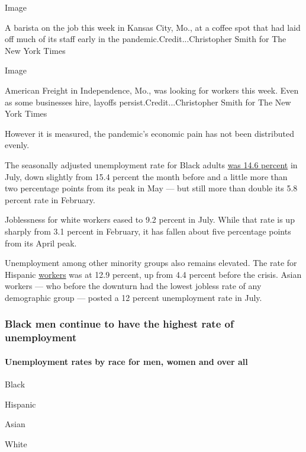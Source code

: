 Image

A barista on the job this week in Kansas City, Mo., at a coffee spot
that had laid off much of its staff early in the
pandemic.Credit...Christopher Smith for The New York Times

Image

American Freight in Independence, Mo., was looking for workers this
week. Even as some businesses hire, layoffs persist.Credit...Christopher
Smith for The New York Times

However it is measured, the pandemic's economic pain has not been
distributed evenly.

The seasonally adjusted unemployment rate for Black adults
\href{https://www.bls.gov/news.release/empsit.t02.htm}{was 14.6 percent}
in July, down slightly from 15.4 percent the month before and a little
more than two percentage points from its peak in May --- but still more
than double its 5.8 percent rate in February.

Joblessness for white workers eased to 9.2 percent in July. While that
rate is up sharply from 3.1 percent in February, it has fallen about
five percentage points from its April peak.

Unemployment among other minority groups also remains elevated. The rate
for Hispanic
\href{https://www.bls.gov/news.release/empsit.t03.htm}{workers} was at
12.9 percent, up from 4.4 percent before the crisis. Asian workers ---
who before the downturn had the lowest jobless rate of any demographic
group --- posted a 12 percent unemployment rate in July.

\hypertarget{black-men-continue-to-have-the-highest-rate-of-unemployment}{%
\subsubsection{Black men continue to have the highest rate of
unemployment}\label{black-men-continue-to-have-the-highest-rate-of-unemployment}}

\hypertarget{unemployment-rates-by-race-for-men-women-and-over-all}{%
\paragraph{Unemployment rates by race for men, women and over
all}\label{unemployment-rates-by-race-for-men-women-and-over-all}}

Black

Hispanic

Asian

White


